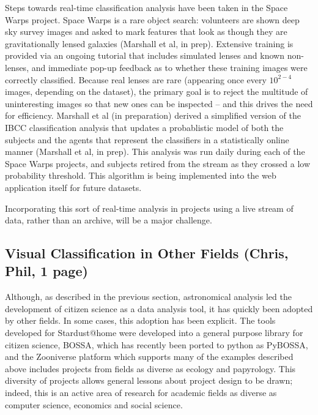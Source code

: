 \documentclass{ar2e}
\begin{document}
Steps towards real-time classification analysis have been taken in the Space
Warps project. Space Warps is a rare object search: volunteers are shown deep
sky survey images and asked to mark features that look as though they are
gravitationally lensed galaxies (Marshall et al, in prep). Extensive training is
provided via an ongoing tutorial that includes simulated lenses and known
non-lenses, and immediate pop-up feedback as to whether these training images
were correctly classified. Because real lenses are rare (appearing once every
$10^{2-4}$ images, depending on the dataset), the primary goal is to reject the
multitude of uninteresting images so that new ones can be inspected -- and this
drives the need for efficiency. Marshall et al (in preparation) derived a
simplified version of the IBCC classification analysis that updates a
probablistic model of both the subjects and the agents that represent the
classifiers in a statistically online manner (Marshall et al, in prep). This
analysis was run daily during each of the Space Warps projects, and subjects
retired from the stream as they crossed a low probability threshold. This
algorithm is being implemented into the web application itself for future
datasets. 

Incorporating this sort of real-time
analysis in projects using a live stream of data, rather than an archive, will
be a major challenge. 


\subsection{Visual Classification in Other Fields (\textbf{Chris}, Phil, 1 page)}
\label{sec:class:non-astro}

Although, as described in the previous section, astronomical analysis led the
development of citizen science as a data analysis tool, it has quickly been
adopted by other fields. In some cases, this adoption has been explicit. The
tools developed for Stardust@home were developed into a general purpose
library for citizen science, BOSSA, which has recently been ported to python
as PyBOSSA, and the Zooniverse platform which supports many of the examples
described above includes projects from fields as diverse as ecology and
papyrology. This diversity of projects allows general lessons about project
design to be drawn; indeed, this is an active area of research for academic
fields as diverse as computer science, economics and social science. 
\end{document}
